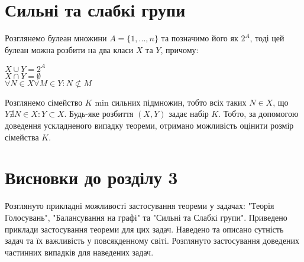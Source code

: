 \section{Сильні та слабкі групи}

Розглянемо  булеан множини $A = \{1,...,n\}$ та позначимо його як $2^A$, тоді цей булеан можна розбити на два класи $X$ та $Y$, причому:

\begin{center}
$X \cup Y = 2^A$
\\
$X \cap Y = \emptyset $
\\
$\forall N \in X \forall M \in Y: N \nsubset M  $     
\end{center}

Розглянемо сімейство $K$ min сильних підмножин, тобто всіх таких $N ∈ X$, що $ Y \nexists N \in X : Y ⊂ X$. Будь-яке розбиття $(X,Y)$ задає набір $K$. Тобто, за допомогою доведення ускладненого випадку теореми, отримано можливість оцінити розмір сімейства $K$.

\section*{Висновки до розділу 3}


	Розглянуто прикладні можливості застосування теореми у задачах: "Теорія Голосувань", "Балансування на графі" та "Сильні та Слабкі групи". Приведено приклади застосування теореми для цих задач. Наведено та описано сутність задач та їх важливість у повсякденному світі. Розглянуто застосування доведених частинних випадків для наведених задач.
